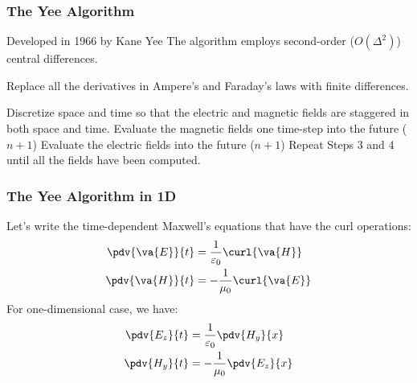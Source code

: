 \documentclass[10pt]{beamer}
\newcommand{\E}{\varepsilon}  %
\renewcommand{\u}{\mu}  %
\begin{document}
\begin{frame}
    \frametitle{The Yee Algorithm}
    \begin{outline}
        \1 Developed in 1966 by Kane Yee
        \1 The algorithm employs second-order ($O(\Delta^2)$) central differences.
    \end{outline}
    \begin{outline}[enumerate]
        \1 Replace all the derivatives in Ampere's and Faraday's laws with finite differences.

        \2 Discretize space and time so that the electric and magnetic fields are staggered in both space and time.
        \1 Evaluate the magnetic fields one time-step into the future ($n+1$)
        \1 Evaluate the electric fields into the future ($n +  1$)
        \1 Repeat Steps 3 and 4 until all the fields have been computed.
    \end{outline}
\end{frame}

\begin{frame}
    \frametitle{The Yee Algorithm in 1D}
    Let's write the time-dependent Maxwell's equations that have the curl operations:
    \begin{align*}
        \pdv{\va{E}}{t} & = \frac{1}{\E_0} \curl{\va{H}}  \\
        \pdv{\va{H}}{t} & = -\frac{1}{\u_0} \curl{\va{E}}
    \end{align*}
    For one-dimensional case, we have:
    \begin{align*}
        \pdv{{E_z}}{t} & = \frac{1}{\E_0} \pdv{H_y}{x}  \\
        \pdv{{H_y}}{t} & = -\frac{1}{\u_0} \pdv{E_z}{x}
    \end{align*}


\end{frame}
\end{document}
